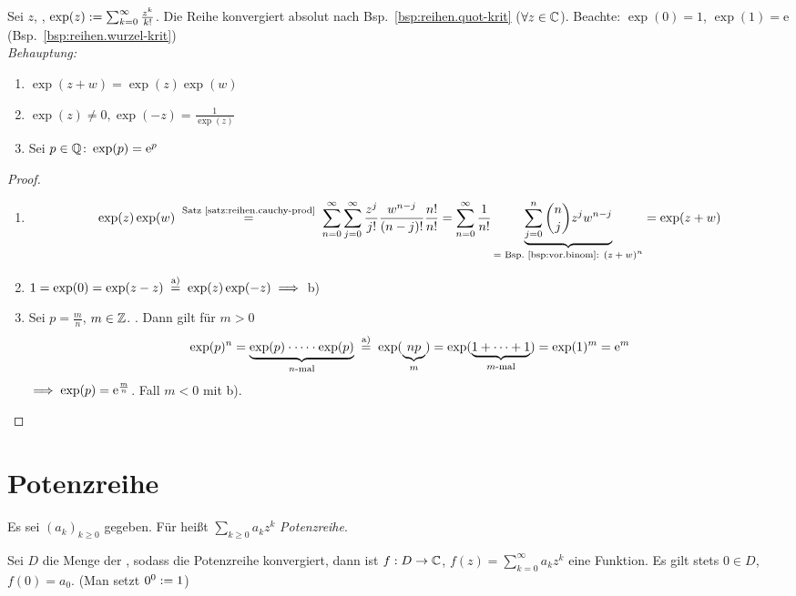 \documentclass[12pt]{scrreprt}
\begin{document}
\begin{bsp}[Exponentialreihe]\label{bsp:reihen.expon-reihe}
Sei $z$, , $\exp(z) := \sum_{k=0}^\infty \frac{z^k}{k!}$.
Die Reihe konvergiert absolut nach Bsp.~\ref{bsp:reihen.quot-krit} ($\forall z\in\mathbb{C}$).
Beachte: $\exp(0) = 1$, $\exp(1) = \mathrm{e}$ (Bsp.~\ref{bsp:reihen.wurzel-krit})\\

\noindent\emph{Behauptung:}
\begin{enumerate}
\item $\exp(z+w) = \exp(z)\exp(w)$\label{bsp:reihen.expon-reihe.a}
\item $\exp(z) \neq 0, \exp(-z) = \frac{1}{\exp(z)}$\label{bsp:reihen.expon-reihe.b}
\item Sei $p\in\mathbb{Q}\colon\exp(p) = \mathrm{e}^p$\label{bsp:reihen.expon-reihe.c}
\end{enumerate}
\end{bsp}
\begin{proof}
\begin{enumerate}
\item \[\exp(z)\exp(w) \nach{=}{Satz \ref{satz:reihen.cauchy-prod}} \sum_{n=0}^\infty\sum_{j=0}^\infty \frac{z^j}{j!} \frac{w^{n-j}}{(n-j)!} \frac{n!}{n!}
= \sum_{n=0}^\infty \frac{1}{n!} \underbrace{\sum_{j=0}^n \binom{n}{j}z^j w^{n-j}}_{\text{= Bsp.~\ref{bsp:vor.binom}: $(z+w)^n$}} 
= \exp(z+w)\]
\item $1 = \exp(0) = \exp(z-z) \nach{=}{a)} \exp(z)\exp(-z) \folgt$ b)
\item Sei $p = \frac{m}{n}$, $m\in\mathbb{Z}$. . Dann gilt für $m > 0$ 
\[\exp(p)^n = \underbrace{\exp(p)\cdot\dotsm\cdot\exp(p)}_{\text{$n$-mal}} \nach{=}{a)} \exp(\underbrace{np}_m)
= \exp(\underbrace{1+\dotsb+1}_{\text{$m$-mal}}) = \exp(1)^m =\mathrm{e}^m\]
$\implies \exp(p) = \mathrm{e}^{\frac{m}{n}}$. Fall $m < 0$ mit b).
\end{enumerate}
\end{proof}

\section{Potenzreihe}
\label{sec:reihen.potenzreihe}
\begin{dfn}\label{dfn:reihen.potenzreihe}
Es sei $(a_k)_{k\ge 0}$ gegeben. Für  heißt $\sum_{k\ge 0} a_kz^k$ \emph{Potenzreihe}.
\end{dfn}

\begin{bem*}
Sei $D$ die Menge der , sodass die Potenzreihe konvergiert, dann ist 
$f: D \rightarrow \mathbb{C}$, $f(z) = \sum_{k=0}^\infty a_kz^k$ eine Funktion. Es gilt stets
$0\in D$, $f(0)=a_0$. (Man setzt $0^0 := 1$)
\end{bem*}
\end{document}
